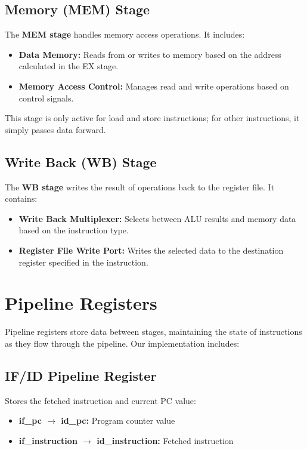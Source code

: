 \documentclass[conference]{IEEEtran}
\begin{document}
\subsection{Memory (MEM) Stage}

The \textbf{MEM stage} handles memory access operations. It includes:

\begin{itemize}
    \item \textbf{Data Memory:} Reads from or writes to memory based on the address calculated in the EX stage.
    
    \item \textbf{Memory Access Control:} Manages read and write operations based on control signals.
\end{itemize}

This stage is only active for load and store instructions; for other instructions, it simply passes data forward.

\subsection{Write Back (WB) Stage}

The \textbf{WB stage} writes the result of operations back to the register file. It contains:

\begin{itemize}
    \item \textbf{Write Back Multiplexer:} Selects between ALU results and memory data based on the instruction type.
    
    \item \textbf{Register File Write Port:} Writes the selected data to the destination register specified in the instruction.
\end{itemize}

\section{Pipeline Registers}
Pipeline registers store data between stages, maintaining the state of instructions as they flow through the pipeline. Our implementation includes:

\subsection{IF/ID Pipeline Register}
Stores the fetched instruction and current PC value:
\begin{itemize}
    \item \textbf{if\_pc $\rightarrow$ id\_pc:} Program counter value
    \item \textbf{if\_instruction $\rightarrow$ id\_instruction:} Fetched instruction
\end{itemize}
\end{document}
